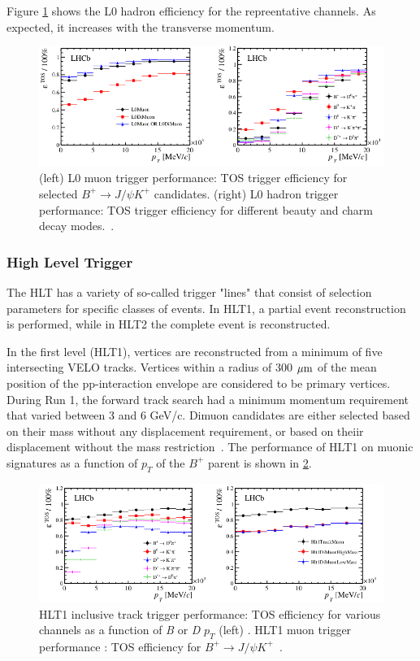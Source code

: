Figure \ref{fig:L0Perf} shows the L0 hadron efficiency for the repreentative channels. As expected, it increases with the transverse momentum. 
\begin{figure} [htb!]
\begin{center}
\includegraphics[scale=0.7]{figs/L0Perf.png}
\caption{(left) L0 muon trigger performance: TOS trigger efficiency for selected $B^+ \rightarrow J/\psi K^+$ candidates. (right) L0 hadron trigger performance: TOS trigger efficiency for different beauty and charm decay modes.~\cite{Aaij:2014jba}.\label{fig:L0Perf}}
\end{center}
\end{figure}


\subsubsection{High Level Trigger}
The HLT has a variety of so-called trigger "lines" that consist of selection parameters for specific classes of events. In HLT1, a partial event reconstruction is performed, while in HLT2 the complete event is reconstructed. 

In the first level (HLT1), vertices are reconstructed from a minimum of five intersecting VELO tracks. Vertices within a radius of 300 $\mu \rm m$ of the mean position of the pp-interaction envelope are considered to be primary vertices. During Run 1, the forward track search had a minimum momentum requirement that varied between 3 and 6 GeV/c. Dimuon candidates are either selected based on their mass without any displacement requirement, or based on theiir displacement without the mass restriction~\cite{}. The performance of HLT1 on muonic signatures as a function of $p_T$ of the $B^+$ parent is shown in \ref{fig:HLT1Perf}. 

\begin{figure} [htb!]
\begin{center}
\includegraphics[scale=0.7]{figs/HLT1Perf.png}
\caption{HLT1 inclusive track trigger performance: TOS efficiency for various channels as a function of \textit{B} or \textit{D} $p_T$ (left) . HLT1 muon trigger performance : TOS efficiency for $B^+\rightarrow J/\psi K^+$~\cite{Aaij:2014jba}.\label{fig:HLT1Perf}}
\end{center}
\end{figure}


